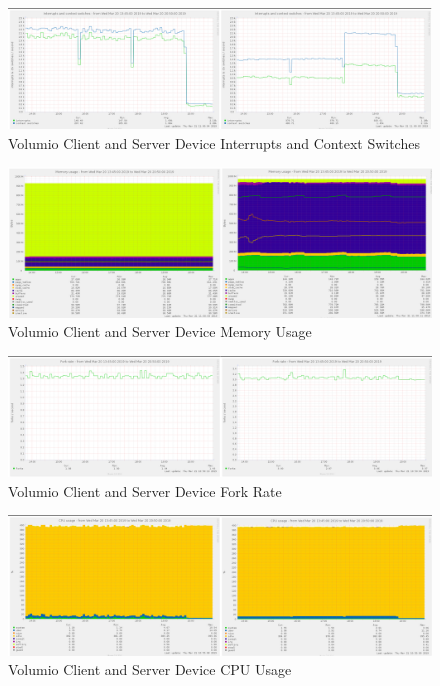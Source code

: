 \documentclass[11pt,a4paper,headinclude=false,footinclude=false]{scrreprt}
\begin{document}
\begin{figure}[H]
\includegraphics{ResultsAndAnalysis/VolumioServerTestImages/015VolumioInterruptsAndContextSwitches.png}
\centering
\caption{Volumio Client and Server Device Interrupts and Context Switches}
\label{VolumioIntCont}
\end{figure}

\begin{figure}[H]
\includegraphics{ResultsAndAnalysis/VolumioServerTestImages/017VolumioMemoryUsage.png}
\centering
\caption{Volumio Client and Server Device Memory Usage}
\label{VolumioMemUse}
\end{figure}

\begin{figure}[H]
\includegraphics{ResultsAndAnalysis/VolumioServerTestImages/013VolumioForkRate.png}
\centering
\caption{Volumio Client and Server Device Fork Rate}
\label{VolumioForkRate}
\end{figure}

\begin{figure}[H]
\includegraphics{ResultsAndAnalysis/VolumioServerTestImages/004VolumioCPUUsage.png}
\centering
\caption{Volumio Client and Server Device CPU Usage}
\label{VolumioCPUUsage}
\end{figure}
\end{document}
